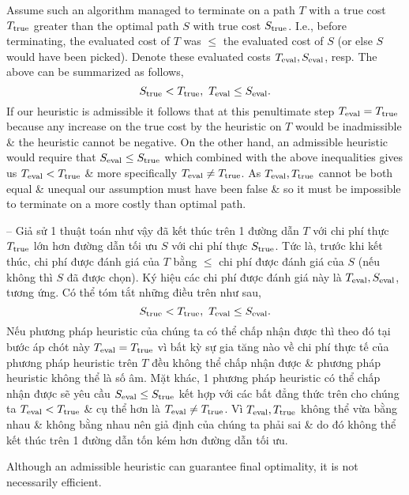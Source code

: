 \documentclass{article}
\begin{document}
Assume such an algorithm managed to terminate on a path $T$ with a true cost $T_{\rm true}$ greater than the optimal path $S$ with true cost $S_{\rm true}$. I.e., before terminating, the evaluated cost of $T$ was $\le$ the evaluated cost of $S$ (or else $S$ would have been picked). Denote these evaluated costs $T_{\rm eval},S_{\rm eval}$, resp. The above can be summarized as follows,
\begin{equation*}
	S_{\rm true} < T_{\rm true},\ T_{\rm eval}\le S_{\rm eval}.
\end{equation*}
If our heuristic is admissible it follows that at this penultimate step $T_{\rm eval} = T_{\rm true}$ because any increase on the true cost by the heuristic on $T$ would be inadmissible \& the heuristic cannot be negative. On the other hand, an admissible heuristic would require that $S_{\rm eval}\le S_{\rm true}$ which combined with the above inequalities gives us $T_{\rm eval} < T_{\rm true}$ \& more specifically $T_{\rm eval}\ne T_{\rm true}$. As $T_{\rm eval},T_{\rm true}$ cannot be both equal \& unequal our assumption must have been false \& so it must be impossible to terminate on a more costly than optimal path.

-- Giả sử 1 thuật toán như vậy đã kết thúc trên 1 đường dẫn $T$ với chi phí thực $T_{\rm true}$ lớn hơn đường dẫn tối ưu $S$ với chi phí thực $S_{\rm true}$. Tức là, trước khi kết thúc, chi phí được đánh giá của $T$ bằng $\le$ chi phí được đánh giá của $S$ (nếu không thì $S$ đã được chọn). Ký hiệu các chi phí được đánh giá này là $T_{\rm eval},S_{\rm eval}$, tương ứng. Có thể tóm tắt những điều trên như sau,
\begin{equation*}
	S_{\rm true} < T_{\rm true},\ T_{\rm eval}\le S_{\rm eval}.
\end{equation*}
Nếu phương pháp heuristic của chúng ta có thể chấp nhận được thì theo đó tại bước áp chót này $T_{\rm eval} = T_{\rm true}$ vì bất kỳ sự gia tăng nào về chi phí thực tế của phương pháp heuristic trên $T$ đều không thể chấp nhận được \& phương pháp heuristic không thể là số âm. Mặt khác, 1 phương pháp heuristic có thể chấp nhận được sẽ yêu cầu $S_{\rm eval}\le S_{\rm true}$ kết hợp với các bất đẳng thức trên cho chúng ta $T_{\rm eval} < T_{\rm true}$ \& cụ thể hơn là $T_{\rm eval}\ne T_{\rm true}$. Vì $T_{\rm eval},T_{\rm true}$ không thể vừa bằng nhau \& không bằng nhau nên giả định của chúng ta phải sai \& do đó không thể kết thúc trên 1 đường dẫn tốn kém hơn đường dẫn tối ưu.

Although an admissible heuristic can guarantee final optimality, it is not necessarily efficient.
\end{document}

